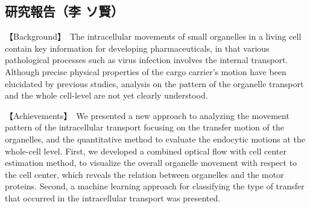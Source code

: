 \subsection{研究報告（李 ソ賢）}


【Background】　The intracellular movements of small organelles in a living cell contain key information for developing pharmaceuticals, in that various pathological processes such as virus infection involves the internal transport. Although precise physical properties of the cargo carrier's motion have been elucidated by previous studies, analysis on the pattern of the organelle transport and the whole cell-level are not yet clearly understood.

【Achievements】　We presented a new approach to analyzing the movement pattern of the intracellular transport focusing on the transfer motion of the organelles, and the quantitative method to evaluate the endocytic motions at the whole-cell level. First, we developed a combined optical flow with cell center estimation method, to visualize the overall organelle movement with respect to the cell center, which reveals the relation between organelles and the motor proteins. Second, a machine learning approach for classifying the type of transfer that occurred in the intracellular transport was presented.

